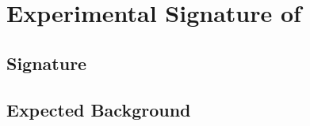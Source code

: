 \chapter[Experimental Signature of \Zprimetotauh]{Experimental Signature of \Zprimetotauh}
\label{chap:AnalysisStrategy}


\section{Signature}
\label{sec:Sinal}


\section{Expected Background}
\label{sec:Bkg}